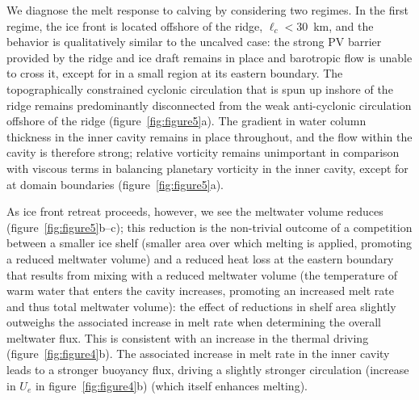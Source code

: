 \documentclass[draft]{agujournal2019}
\begin{document}
We diagnose the melt response to calving by considering two regimes. In the first regime, the ice front is located offshore of the ridge, $\ell_c < 30$~km, and the behavior is qualitatively similar to the uncalved case: the strong PV barrier provided by the ridge and ice draft remains in place and barotropic flow is unable to cross it, except for in a small region at its eastern boundary. The topographically constrained cyclonic circulation that is spun up inshore of the ridge remains predominantly disconnected from the weak anti-cyclonic circulation offshore of the ridge (figure~\ref{fig:figure5}a). The gradient in water column thickness in the inner cavity remains in place throughout, and the flow within the cavity is therefore strong; relative vorticity remains unimportant in comparison with viscous terms in balancing planetary vorticity in the inner cavity, except for at domain boundaries (figure~\ref{fig:figure5}a).

As ice front retreat proceeds, however, we see the meltwater volume reduces (figure~\ref{fig:figure5}b--c); this reduction is the non-trivial outcome of a competition between a smaller ice shelf (smaller area over which melting is applied, promoting a reduced meltwater volume) and a reduced heat loss at the eastern boundary that results from mixing with a reduced meltwater volume (the temperature of warm water that enters the cavity increases, promoting an increased melt rate and thus total meltwater volume): the effect of reductions in shelf area slightly outweighs the associated increase in melt rate when determining the overall meltwater flux. This is consistent with an increase in the thermal driving (figure~\ref{fig:figure4}b). The associated increase in melt rate in the inner cavity leads to a stronger buoyancy flux, driving a slightly stronger circulation (increase in $U_e$ in figure~\ref{fig:figure4}b) (which itself enhances melting).
\end{document}
